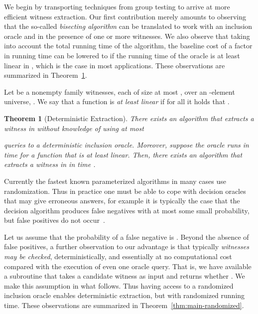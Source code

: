 \documentclass[11pt]{article}
\newtheorem{theorem}{Theorem}[]
\begin{document}
We begin by transporting techniques from group testing \cite{DuHwang2000} to arrive at more efficient witness extraction. Our first contribution merely amounts to observing that the so-called {\em bisecting algorithm} \cite{DuHwang1993} can be translated to work with an inclusion oracle and in the presence of one or more witnesses. We also observe that taking into account the total running time of the algorithm, the baseline cost of a factor  in running time can be lowered to  if the running time of the oracle is at least linear in , which is the case in most applications. These observations are summarized in Theorem~\ref{thm:main-deterministic}.

Let  be a nonempty family witnesses, each of size at most , 
over an -element universe, .
We say that a function  is 
{\em at least linear} if for all  it holds
that .

\begin{theorem}[Deterministic Extraction]
\label{thm:main-deterministic}
There exists an algorithm that extracts a witness in  
without knowledge of  using at most 

queries to a deterministic inclusion oracle. Moreover, suppose the
oracle runs in time  for a function  that 
is at least linear. Then, there exists an algorithm that 
extracts a witness in  in time . 
\end{theorem}

Currently the fastest known parameterized algorithms 
in many cases use randomization. Thus in practice one must be able to 
cope with decision oracles that may give erroneous answers, for example 
it is typically the case that the decision algorithm produces false 
negatives with at most some small probability, but false positives do 
not occur~\cite{BjorklundHusfeldtKaskiKoivisto2010,BjorklundKaskiKowalik2013,Williams2009,Koutis2012}. 

Let us assume that the probability of a false negative is . 
Beyond the absence of false positives, a further observation to our 
advantage is that typically {\em witnesses may be checked}, deterministically, 
and essentially at no computational cost compared with the
execution of even one oracle query. That is, we have available a subroutine
that takes a candidate witness  as input and returns 
whether . We make this assumption in what follows.
Thus having access to a randomized inclusion oracle enables deterministic
extraction, but with randomized running time. These observations are 
summarized in Theorem~\ref{thm:main-randomized}.
\end{document}
